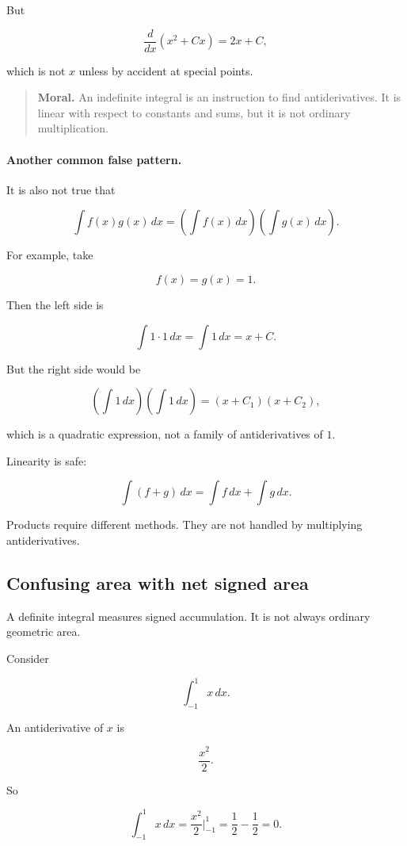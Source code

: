But

\[
\frac{d}{dx}(x^2+Cx)=2x+C,
\]

which is not \(x\) unless by accident at special points.

\begin{quote}
\textbf{Moral.}
An indefinite integral is an instruction to find antiderivatives.  It is linear with
respect to constants and sums, but it is not ordinary multiplication.
\end{quote}

\paragraph{Another common false pattern.}
It is also not true that

\[
\int f(x)g(x)\,dx
=
\left(\int f(x)\,dx\right)
\left(\int g(x)\,dx\right).
\]

For example, take

\[
f(x)=g(x)=1.
\]

Then the left side is

\[
\int 1\cdot1\,dx
=
\int 1\,dx
=
x+C.
\]

But the right side would be

\[
\left(\int 1\,dx\right)\left(\int 1\,dx\right)
=
(x+C_1)(x+C_2),
\]

which is a quadratic expression, not a family of antiderivatives of \(1\).

Linearity is safe:

\[
\int (f+g)\,dx=\int f\,dx+\int g\,dx.
\]

Products require different methods.  They are not handled by multiplying
antiderivatives.

\subsection{Confusing area with net signed area}
\label{subsec:warning-area-net-signed-area}

A definite integral measures signed accumulation.  It is not always ordinary
geometric area.

Consider

\[
\int_{-1}^{1} x\,dx.
\]

An antiderivative of \(x\) is

\[
\frac{x^2}{2}.
\]

So

\[
\int_{-1}^{1} x\,dx
=
\frac{x^2}{2}\Big|_{-1}^{1}
=
\frac12-\frac12
=
0.
\]

